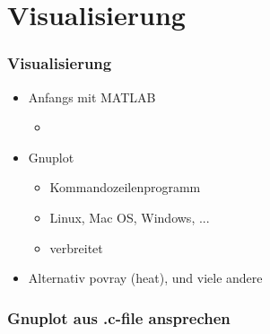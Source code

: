 \section{Visualisierung}

\begin{frame}
\frametitle{Visualisierung}
	\begin{itemize}[<+->]
	\item Anfangs mit MATLAB
		\begin{itemize}[<+->]
		\item 
		\end{itemize} 		
	\item Gnuplot
		\begin{itemize}[<+->]
		\item Kommandozeilenprogramm
		\item Linux, Mac OS, Windows, ...
		\item verbreitet
		\end{itemize} 
	\item Alternativ povray (heat), und viele andere
	\end{itemize} 
\end{frame}

\begin{frame}
\frametitle{Gnuplot aus .c-file ansprechen}
	
\end{frame}
